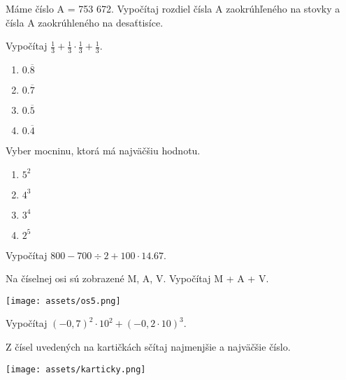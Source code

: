 \begin{example}
	Máme číslo A = 753 672. Vypočítaj rozdiel čísla A zaokrúhľeného na stovky a čísla A zaokrúhleného na desaťtisíce.
\end{example}

\begin{example}
	Vypočítaj $\frac{1}{3} + \frac{1}{3} \cdot \frac{1}{3} + \frac{1}{3}$.\\
	\begin{enumerate}
		\item $0.\overline{8}$
		\item $0.\overline{7}$
		\item $0.\overline{5}$
		\item $0.\overline{4}$
	\end{enumerate}
\end{example}

\begin{example}
	Vyber mocninu, ktorá má najväčšiu hodnotu.
	\begin{enumerate}
		\item $5^2$
		\item $4^3$
		\item $3^4$
		\item $2^5$
	\end{enumerate}
\end{example}

\begin{example}
	Vypočítaj $800 - 700 \div 2 + 100 \cdot 14.67$.
\end{example}

\begin{example}
	Na číselnej osi sú zobrazené M, A, V. Vypočítaj M + A + V. \\
	\begin{center}
		\texttt{[image: assets/os5.png]}
	\end{center}
\end{example}

\begin{example}
	Vypočítaj $(-0,7)^2 \cdot 10^2 + (-0,2 \cdot 10)^3$.
\end{example}

\begin{example}
	Z čísel uvedených na kartičkách sčítaj najmenjšie a najväčšie číslo.\\
	\begin{center}
		\texttt{[image: assets/karticky.png]}
	\end{center}
\end{example}

